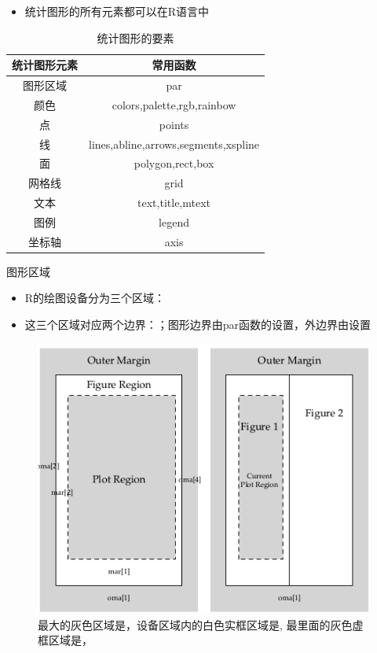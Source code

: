 \documentclass{beamerthemeMono}
\begin{document}
\begin{frame}[t]{\subsecname}
\begin{itemize}
\item<1-> 统计图形的所有元素都可以在R语言中
\end{itemize}

\begin{overlayarea}{\textwidth}{\textheight}
  \begin{table} \centering \small
    \begin{tabular}{|c|c|}
      \toprule
      \rowcolor{LightCyan}
      统计图形元素 & 常用函数\\\hline
      图形区域 & par\\\hline
      颜色 & colors,palette,rgb,rainbow\\\hline
      点 & points\\\hline
      线 & lines,abline,arrows,segments,xspline\\\hline
      面 & polygon,rect,box \\\hline
      网格线 & grid \\\hline
      文本 & text,title,mtext \\\hline
      图例 & legend\\\hline
      坐标轴 & axis \\   
      \bottomrule
    \end{tabular}
    \caption{统计图形的要素}
  \end{table}
\end{overlayarea}  
\end{frame}

\begin{frame}[t]{\subsecname}{图形区域}
\begin{itemize}
\item R的绘图设备分为三个区域：
\item 这三个区域对应两个边界：；图形边界由par函数的设置，外边界由设置
\end{itemize}  

\begin{figure}
  \centering
  \includegraphics[width=0.5\columnwidth]{plot_region.png}
  \caption{最大的灰色区域是，设备区域内的白色实框区域是,
最里面的灰色虚框区域是，}
\end{figure}
\end{frame}
\end{document}
